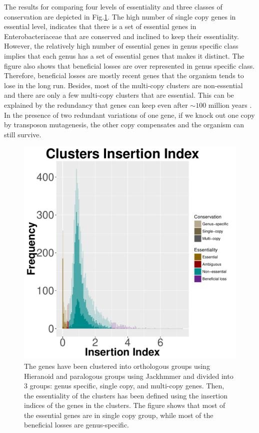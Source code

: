 \documentclass[12pt,letterpaper]{article}
\begin{document}
The results for comparing four levels of essentiality and three classes of conservation are depicted in Fig.\@ \ref{fig:iidist}. The high number of single copy genes in essential level, indicates that there is a set of essential genes in Enterobacteriaceae that are conserved and inclined to keep their essentiality. However, the relatively high number of essential genes in genus specific class implies that each genus has a set of essential genes that makes it distinct. The figure also shows that beneficial losses are over represented in genus specific class. Therefore, beneficial losses are mostly recent genes that the organism tends to lose in the long run. Besides, most of the multi-copy clusters are non-essential and there are only a few multi-copy clusters that are essential. This can be explained by the redundancy that genes can keep even after $\sim100$ million years \cite{dean_pervasive_2008}. In the presence of two redundant variations of one gene, if we knock out one copy by transposon mutagenesis, the other copy compensates and the organism can still survive.

\begin{figure}
\centering
\includegraphics[scale=0.5]{cluster-essentiality.pdf}
\caption{The genes have been clustered into orthologous groups using Hieranoid and paralogous groups using Jackhmmer and divided into 3 groups: genus specific, single copy, and multi-copy genes. Then, the essentiality of the clusters has been defined using the insertion indices of the genes in the clusters. The figure shows that most of the essential genes are in single copy group, while most of the beneficial losses are genus-specific.}
\label{fig:iidist}
\end{figure}
\end{document}

